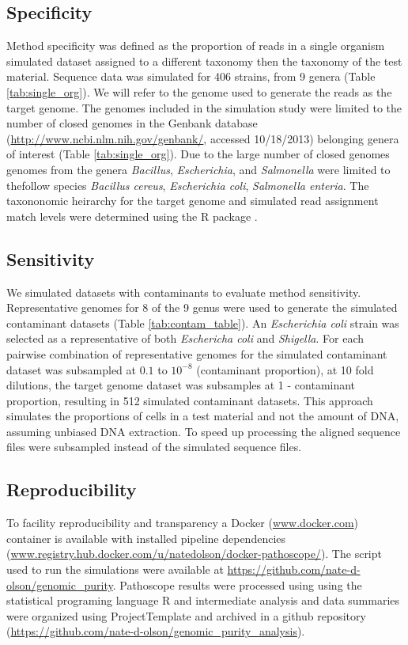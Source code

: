 \documentclass[fleqn,10pt,lineno]{wlpeerj}\usepackage[]{graphicx}\usepackage[]{color}
\begin{document}
\subsection*{Specificity} 
Method specificity was defined as the proportion of reads in a single organism simulated dataset assigned to a different taxonomy then the taxonomy of the test material. 
Sequence data was simulated for 406 strains, from 9 genera (Table \ref{tab:single_org}). 
We will refer to the genome used to generate the reads as the target genome. 
The genomes included in the simulation study were limited to the number of closed genomes in the Genbank database (\url{http://www.ncbi.nlm.nih.gov/genbank/}, accessed 10/18/2013) belonging genera of interest (Table \ref{tab:single_org}). 
Due to the large number of closed genomes genomes from the genera \textit{Bacillus}, \textit{Escherichia}, and \textit{Salmonella} were limited to thefollow species \textit{Bacillus cereus}, \textit{Escherichia coli}, \textit{Salmonella enteria}. 
The taxononomic heirarchy for the target genome and simulated read assignment match levels were determined using the R package \citep{TaxizeArticle,TaxizeManual}. 

\subsection*{Sensitivity}
We simulated datasets with contaminants to evaluate method sensitivity. 
Representative genomes for 8 of the 9 genus were used to generate the simulated contaminant datasets (Table \ref{tab:contam_table}). 
An \textit{Escherichia coli} strain was selected as a representative of both \textit{Eschericha coli} and \textit{Shigella}. 
For each pairwise combination of representative genomes for the simulated contaminant dataset was subsampled at $0.1$ to $10^{-8}$ (contaminant proportion), at 10 fold dilutions, the target genome dataset was subsamples at 1 - contaminant proportion, resulting in 512 simulated contaminant datasets. 
This approach simulates the proportions of cells in a test material and not the amount of DNA, assuming unbiased DNA extraction. 
To speed up processing the aligned sequence files were subsampled instead of the simulated sequence files. 

\subsection*{Reproducibility}
To facility reproducibility and transparency a Docker (\url{www.docker.com}) container is available with installed pipeline dependencies (\url{www.registry.hub.docker.com/u/natedolson/docker-pathoscope/}). 
The script used to run the simulations were available at \url{https://github.com/nate-d-olson/genomic_purity}. 
Pathoscope results were processed using using the statistical programing language R \citep{R} and intermediate analysis and data summaries were organized using ProjectTemplate \citep{ProjectTemplate} and archived in a github repository (\url{https://github.com/nate-d-olson/genomic_purity_analysis}).
\end{document}
